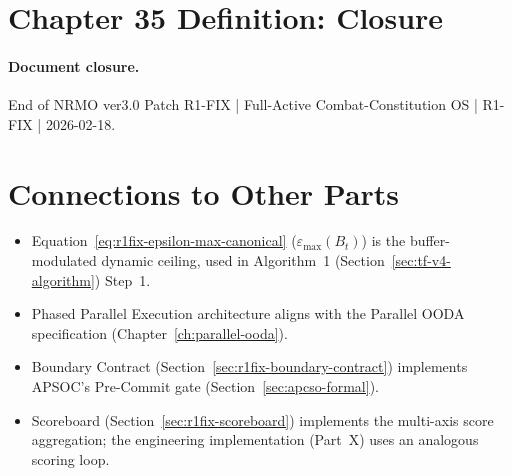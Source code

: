 \section{Chapter 35 Definition: Closure}
\label{sec:r1fix-closure}


\paragraph{Document closure.}
End of NRMO ver3.0 Patch R1-FIX | Full-Active Combat-Constitution OS
| R1-FIX | 2026-02-18.

\section*{Connections to Other Parts}

\begin{itemize}
\item Equation~\ref{eq:r1fix-epsilon-max-canonical} ($\varepsilon_{\max}(B_t)$)
is the buffer-modulated dynamic ceiling, used in Algorithm~1
(Section~\ref{sec:tf-v4-algorithm}) Step~1.
\item Phased Parallel Execution architecture aligns with the
Parallel OODA specification (Chapter~\ref{ch:parallel-ooda}).
\item Boundary Contract (Section~\ref{sec:r1fix-boundary-contract})
implements APSOC's Pre-Commit gate
(Section~\ref{sec:apcso-formal}).
\item Scoreboard (Section~\ref{sec:r1fix-scoreboard}) implements the
multi-axis score aggregation; the engineering implementation
(Part~X) uses an analogous scoring loop.
\end{itemize}
